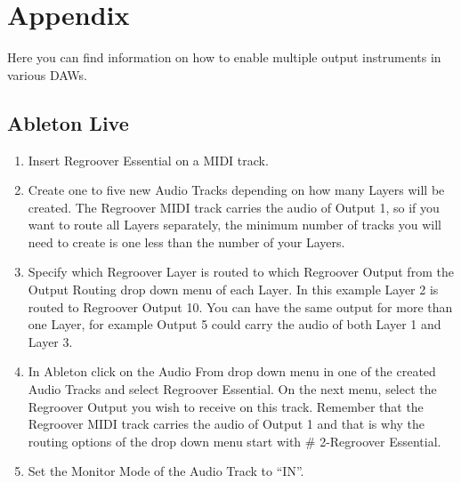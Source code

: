 \documentclass[12pt]{article}
\begin{document}
\newpage
\section*{Appendix}
Here you can find information on how to enable multiple output instruments in various DAWs.

\subsection*{Ableton Live}
\begin{enumerate}
\item Insert Regroover Essential on a MIDI track.
\item Create one to five new Audio Tracks depending on how many Layers will be created. The Regroover MIDI track carries the audio of Output 1, so if you want to route all Layers separately, the minimum number of tracks you will need to create is one less than the number of your Layers. 
\item Specify which Regroover Layer is routed to which Regroover Output from the Output Routing drop down menu of each Layer. In this example Layer 2 is routed to Regroover Output 10. You can have the same output for more than one Layer, for example Output 5 could carry the audio of both Layer 1 and Layer 3.
\item In Ableton click on the Audio From drop down menu in one of the created Audio Tracks and select Regroover Essential. On the next menu, select the Regroover Output you wish to receive on this track. Remember that the Regroover MIDI track carries the audio of Output 1 and that is why the routing options of the drop down menu start with \# 2-Regroover Essential.
\item Set the Monitor Mode of the Audio Track to “IN”.
\end{enumerate}
\end{document}
